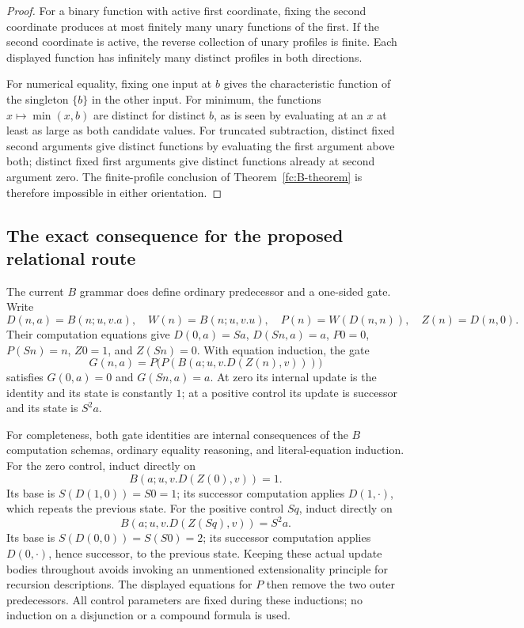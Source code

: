 \begin{proof}
For a binary function with active first coordinate, fixing the second
coordinate produces at most finitely many unary functions of the first.
If the second coordinate is active, the reverse collection of unary
profiles is finite. Each displayed function has infinitely many
distinct profiles in both directions.

For numerical equality, fixing one input at $b$ gives the characteristic
function of the singleton $\{b\}$ in the other input. For minimum,
the functions $x\mapsto\min(x,b)$ are distinct for distinct $b$, as is
seen by evaluating at an $x$ at least as large as both candidate values.
For truncated subtraction, distinct fixed second arguments give distinct
functions by evaluating the first argument above both; distinct fixed
first arguments give distinct functions already at second argument zero.
The finite-profile conclusion of Theorem~\ref{fc:B-theorem} is therefore
impossible in either orientation.
\end{proof}

\subsection{The exact consequence for the proposed relational route}

The current $B$ grammar does define ordinary predecessor and a one-sided
gate. Write
\[
 D(n,a)=B(n;u,v.a),\quad W(n)=B(n;u,v.u),\quad
 P(n)=W(D(n,n)),\quad Z(n)=D(n,0).
\]
Their computation equations give
$D(0,a)=Sa$, $D(Sn,a)=a$, $P0=0$, $P(Sn)=n$, $Z0=1$, and $Z(Sn)=0$.
With equation induction, the gate
\[
             G(n,a)=P\bigl(P(B(a;u,v.D(Z(n),v)))\bigr)
\]
satisfies $G(0,a)=0$ and $G(Sn,a)=a$. At zero its internal update is
the identity and its state is constantly $1$; at a positive control its
update is successor and its state is $S^2a$.

For completeness, both gate identities are internal consequences of the
$B$ computation schemas, ordinary equality reasoning, and literal-equation
induction. For the zero control, induct directly on
\[
                 B(a;u,v.D(Z(0),v))=1.
\]
Its base is $S(D(1,0))=S0=1$; its successor computation applies
$D(1,\cdot)$, which repeats the previous state. For the positive control
$Sq$, induct directly on
\[
                 B(a;u,v.D(Z(Sq),v))=S^2a.
\]
Its base is $S(D(0,0))=S(S0)=2$; its successor computation applies
$D(0,\cdot)$, hence successor, to the previous state. Keeping these
actual update bodies throughout avoids invoking an unmentioned
extensionality principle for recursion descriptions. The displayed
equations for $P$ then remove the two outer predecessors.
All control parameters are fixed during these inductions; no induction
on a disjunction or a compound formula is used.


